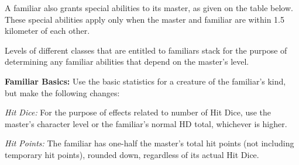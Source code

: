 A familiar also grants special abilities to its master, as given on the table below. These special abilities apply only when the master and familiar are within 1.5 kilometer of each other.

Levels of different classes that are entitled to familiars stack for the purpose of determining any familiar abilities that depend on the master's level.



\textbf{Familiar Basics:} Use the basic statistics for a creature of the familiar's kind, but make the following changes:

\textit{Hit Dice:} For the purpose of effects related to number of Hit Dice, use the master's character level or the familiar's normal HD total, whichever is higher.

\textit{Hit Points:} The familiar has one-half the master's total hit points (not including temporary hit points), rounded down, regardless of its actual Hit Dice.

